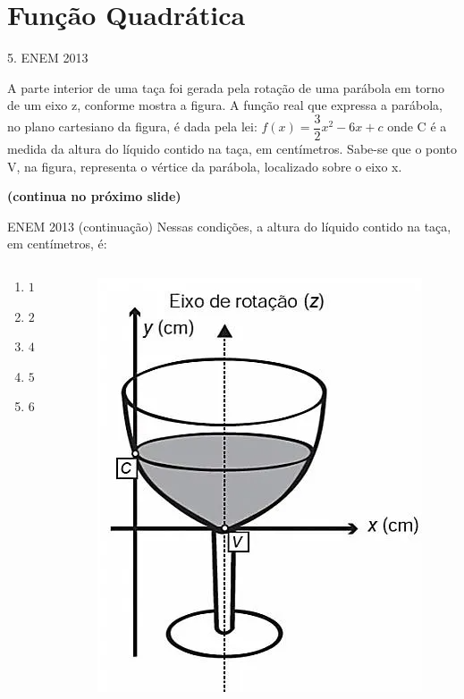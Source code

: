 \documentclass[11pt]{beamer}
\begin{document}
\section{Função Quadrática}

\begin{frame}{5. ENEM 2013}
    
    A parte interior de uma taça foi gerada pela rotação de uma parábola em torno de um eixo z, conforme mostra a figura. A função real que expressa a parábola, no plano cartesiano da figura, é dada pela lei: $f(x)=\dfrac{3}{2}x^{2}-6x+c$ onde C é a medida da altura do líquido contido na taça, em centímetros. Sabe-se que o ponto V, na figura, representa o vértice da parábola, localizado sobre o eixo x. 

    \vfill
    \textbf{(continua no próximo slide)}
    
\end{frame}

\begin{frame}{ENEM 2013 (continuação)}
    Nessas condições, a altura do líquido contido na taça, em centímetros, é:
    \begin{columns}
        \begin{column}{0.4\textwidth}
            \begin{enumerate}[a]
                \item $1$ 
                \item $2$  
                \item $4$
                \item $5$ 
                \item $6$ %
            \end{enumerate}
        \end{column}

        \begin{column}{0.6\textwidth}
            \centering
            \includegraphics[width=0.7\linewidth]{imagens/enem 2013.png}
        \end{column}
    \end{columns}
    
\end{frame}
\end{document}
